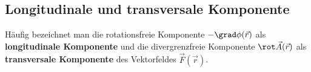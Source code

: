  \subsection{Longitudinale und transversale Komponente}
  Häufig bezeichnet man die rotationsfreie Komponente $- \grad \phi (\vec{r})$ als
  \textbf{longitudinale Komponente} und die divergrenzfreie Komponente
  $\rot\vec{A}(\vec{r})$ als \textbf{transversale Komponente} des Vektorfeldes $\vec{F}(\vec{r})$. 